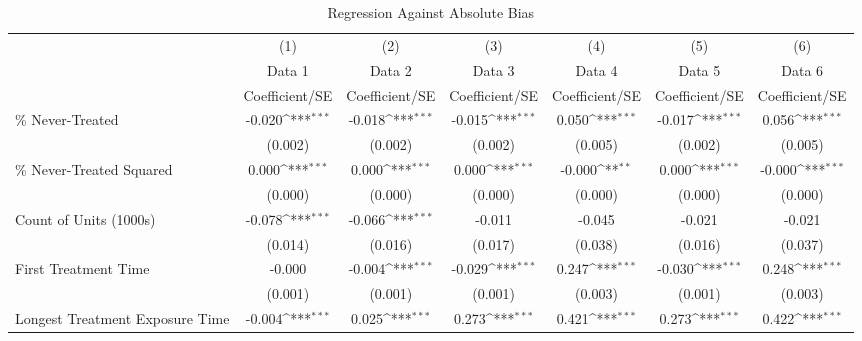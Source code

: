 \begin{table}[htbp]\centering
\def\sym#1{\ifmmode^{#1}\else\(^{#1}\)\fi}
\caption{Regression Against Absolute Bias}
\begin{tabular}{l*{6}{c}}
\hline\hline
                    &\multicolumn{1}{c}{(1)}&\multicolumn{1}{c}{(2)}&\multicolumn{1}{c}{(3)}&\multicolumn{1}{c}{(4)}&\multicolumn{1}{c}{(5)}&\multicolumn{1}{c}{(6)}\\
                    &\multicolumn{1}{c}{Data 1}&\multicolumn{1}{c}{Data 2}&\multicolumn{1}{c}{Data 3}&\multicolumn{1}{c}{Data 4}&\multicolumn{1}{c}{Data 5}&\multicolumn{1}{c}{Data 6}\\
                    &Coefficient/SE         &Coefficient/SE         &Coefficient/SE         &Coefficient/SE         &Coefficient/SE         &Coefficient/SE         \\
\hline
\% Never-Treated    &      -0.020\sym{***}&      -0.018\sym{***}&      -0.015\sym{***}&       0.050\sym{***}&      -0.017\sym{***}&       0.056\sym{***}\\
                    &     (0.002)         &     (0.002)         &     (0.002)         &     (0.005)         &     (0.002)         &     (0.005)         \\
\% Never-Treated Squared&       0.000\sym{***}&       0.000\sym{***}&       0.000\sym{***}&      -0.000\sym{**} &       0.000\sym{***}&      -0.000\sym{***}\\
                    &     (0.000)         &     (0.000)         &     (0.000)         &     (0.000)         &     (0.000)         &     (0.000)         \\
Count of Units (1000s)&      -0.078\sym{***}&      -0.066\sym{***}&      -0.011         &      -0.045         &      -0.021         &      -0.021         \\
                    &     (0.014)         &     (0.016)         &     (0.017)         &     (0.038)         &     (0.016)         &     (0.037)         \\
First Treatment Time&      -0.000         &      -0.004\sym{***}&      -0.029\sym{***}&       0.247\sym{***}&      -0.030\sym{***}&       0.248\sym{***}\\
                    &     (0.001)         &     (0.001)         &     (0.001)         &     (0.003)         &     (0.001)         &     (0.003)         \\
Longest Treatment Exposure Time&      -0.004\sym{***}&       0.025\sym{***}&       0.273\sym{***}&       0.421\sym{***}&       0.273\sym{***}&       0.422\sym{***}\\

\end{tabular}
\end{table}
